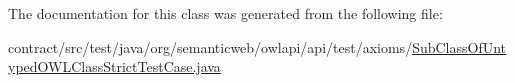 The documentation for this class was generated from the following file\-:\begin{DoxyCompactItemize}
\item 
contract/src/test/java/org/semanticweb/owlapi/api/test/axioms/\hyperlink{_sub_class_of_untyped_o_w_l_class_strict_test_case_8java}{Sub\-Class\-Of\-Untyped\-O\-W\-L\-Class\-Strict\-Test\-Case.\-java}\end{DoxyCompactItemize}
